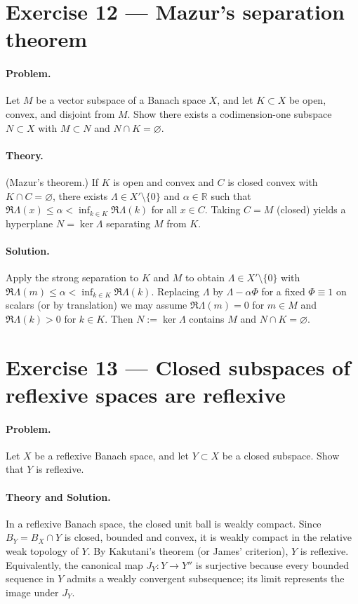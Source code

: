 \documentclass[12pt,a4paper]{article}
\theoremstyle{plain}
\theoremstyle{definition}
\theoremstyle{remark}
\theoremstyle{remark}
\theoremstyle{definition}
\begin{document}
	\bigskip
	
	\section*{Exercise 12 — Mazur's separation theorem}
	
	\paragraph{Problem.}
	Let $M$ be a vector subspace of a Banach space $X$, and let $K\subset X$ be open, convex, and disjoint from $M$.
	Show there exists a codimension-one subspace $N\subset X$ with $M\subset N$ and $N\cap K=\varnothing$.
	
	\paragraph{Theory.}
	(Mazur’s theorem.) If $K$ is open and convex and $C$ is closed convex with $K\cap C=\varnothing$,
	there exists $\Lambda\in X'\setminus\{0\}$ and $\alpha\in\mathbb R$ such that
	$\Re\Lambda(x)\le \alpha<\inf_{k\in K}\Re\Lambda(k)$ for all $x\in C$.
	Taking $C=M$ (closed) yields a hyperplane $N=\ker\Lambda$ separating $M$ from $K$.
	
	\paragraph{Solution.}
	Apply the strong separation to $K$ and $M$ to obtain $\Lambda\in X'\setminus\{0\}$ with
	$\Re\Lambda(m)\le \alpha < \inf_{k\in K}\Re\Lambda(k)$. Replacing $\Lambda$ by $\Lambda-\alpha\Phi$
	for a fixed $\Phi\equiv 1$ on scalars (or by translation) we may assume $\Re\Lambda(m)=0$ for $m\in M$
	and $\Re\Lambda(k)>0$ for $k\in K$. Then $N:=\ker\Lambda$ contains $M$ and $N\cap K=\varnothing$.
	
	\bigskip
	
	\section*{Exercise 13 — Closed subspaces of reflexive spaces are reflexive}
	
	\paragraph{Problem.}
	Let $X$ be a reflexive Banach space, and let $Y\subset X$ be a closed subspace. Show that $Y$ is reflexive.
	
	\paragraph{Theory and Solution.}
	In a reflexive Banach space, the closed unit ball is weakly compact.
	Since $B_Y=B_X\cap Y$ is closed, bounded and convex, it is weakly compact in the relative weak topology of $Y$.
	By Kakutani’s theorem (or James’ criterion), $Y$ is reflexive.
	Equivalently, the canonical map $J_Y:Y\to Y''$ is surjective because every bounded sequence in $Y$ admits a weakly convergent subsequence; its limit represents the image under $J_Y$.
	
\end{document}
